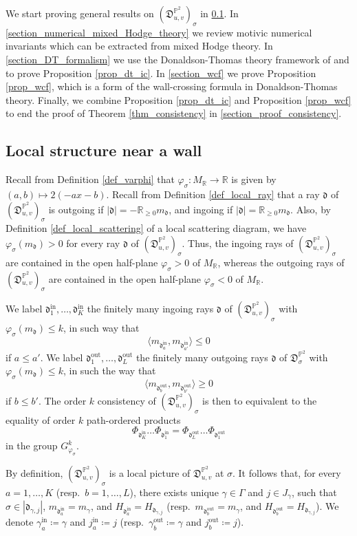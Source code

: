 \documentclass[12pt, a4paper]{amsart}
\newcommand\PP{\mathbb P}
\newcommand\R{\mathbb R}
\newcommand\fd{\mathfrak d}
\newcommand\fD{\mathfrak D}
\newcommand\iin{\mathrm{in}}
\newcommand\oout{\mathrm{out}}
\begin{document}
We start proving general results on
$(\fD_{u,v}^{\PP^2})_\sigma$ in
\cref{section_local_wall}. 
In 
\cref{section_numerical_mixed_Hodge_theory} we review motivic numerical invariants which can be extracted from mixed Hodge theory. In \cref{section_DT_formalism} we use the Donaldson-Thomas theory framework of
\cite{meinhardt2017donaldson} and
 \cite{meinhardt2015donaldson}
to prove Proposition \ref{prop_dt_ic}.
In \cref{section_wcf} we prove Proposition 
\ref{prop_wcf}, which is a form of the wall-crossing formula in Donaldson-Thomas theory. Finally, we combine Proposition \ref{prop_dt_ic} and Proposition \ref{prop_wcf} to end the proof of Theorem 
\ref{thm_consistency} in \cref{section_proof_consistency}.
 
\subsection{Local structure near a wall}
\label{section_local_wall}
Recall from Definition \ref{def_varphi} that  $\varphi_\sigma \colon M_\R \rightarrow \R$ is given by $(a,b) \mapsto 2(-ax-b)$. 
Recall from Definition \ref{def_local_ray} that a ray $\fd$ of $(\fD_{u,v}^{\PP^2})_\sigma$ is outgoing if $|\fd|=-\R_{\geqslant 0}m_\fd$, and ingoing if $|\fd|=\R_{\geqslant 0} m_\fd$. 
Also, by Definition 
\ref{def_local_scattering}
of a local scattering diagram, we have $\varphi_\sigma(m_\fd)>0$ for every ray $\fd$ of $(\fD_{u,v}^{\PP^2})_\sigma$.
Thus, the ingoing rays of $(\fD_{u,v}^{\PP^2})_\sigma$ are contained 
in the open half-plane 
$\varphi_\sigma >0$ of $M_\R$,
whereas the outgoing rays of $(\fD_{u,v}^{\PP^2})_\sigma$
are contained in the open half-plane 
$\varphi_\sigma <0$ of $M_\R$.


We label $\fd_1^{\iin}, \dots, \fd_K^{\iin}$ the finitely many ingoing rays $\fd$ of $(\fD_{u,v}^{\PP^2})_\sigma$ with $\varphi_\sigma(m_\fd) \leqslant k$,
in such way that 
\[\langle m_{\fd_a^\iin}, m_{\fd_{a'}^\iin} \rangle \leqslant 0\] if
$a \leqslant a'$.
We label $\fd_1^{\oout},\dots,\fd_L^{\oout}$ the finitely many outgoing rays $\fd$ of $\fD_{\sigma}^{\PP^2}$
 with $\varphi_\sigma(m_\fd) \leqslant k$, in such the way that 
 \[\langle m_{\fd_b^\oout}, m_{\fd_{b'}^\oout} \rangle \geqslant 0\] if
$b \leqslant b'$.
The order $k$ consistency of $(\fD_{u,v}^{\PP^2})_\sigma$
is then to equivalent to the equality of order $k$ path-ordered products
\[\Phi_{\fd_K^{\iin}} \dots \Phi_{\fd_1^{\iin}}
= \Phi_{\fd_L^{\oout}} \dots \Phi_{\fd_1^{\oout}}\]
in the group $G_{\varphi_\sigma}^k$.


By definition, $(\fD_{u,v}^{\PP^2})_\sigma$ is a local picture of $\fD^{\PP^2}_{u,v}$
at $\sigma$. It follows that, for every 
$a=1,\dots, K$ (resp.\ $b=1,\dots, L$), there exists 
unique
$\gamma \in \Gamma$ and $j \in J_\gamma$, 
such that $\sigma \in |\fd_{\gamma,j}|$,
$m_{\fd_a^{\iin}}=m_\gamma$, 
and 
$H_{\fd_a^{\iin}}=H_{\fd_{\gamma,j}}$ 
(resp.\
$m_{\fd_b^{\oout}}=m_\gamma$, and 
$H_{\fd_b^{\oout}}=H_{\fd_{\gamma,j}}$).
We denote $\gamma_a^{\iin} \coloneq \gamma$ and 
$j_a^{\iin} \coloneq j$
(resp.\ $\gamma_b^{\oout}\coloneq \gamma$
and $j_b^{\oout} \coloneq j$).
\end{document}
